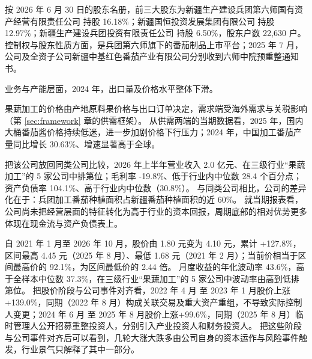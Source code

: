  按 2026 年 6 月 30 日的股东名册，前三大股东为新疆生产建设兵团第六师国有资产经营有限责任公司 持股 16.18\%；新疆国恒投资发展集团有限公司 持股 12.97\%；新疆生产建设兵团投资有限责任公司 持股 6.50\%，股东户数 22,630 户。 控制权与股东性质方面，是兵团第六师旗下的番茄制品上市平台；2025 年 7 月，公司及全资子公司新疆中基红色番茄产业有限公司分别收到六师中院预重整通知书。

 业务与产能层面，2024 年，出口量及价格水平整体下滑。

 果蔬加工的价格由产地原料果价格与出口订单决定，需求端受海外需求与关税影响（第 \ref{sec:framework} 章的供需框架）。 从供需两端的当期数据看，2025 年，国内大桶番茄酱价格持续低迷，进一步加剧价格下行压力；2024 年，中国加工番茄产量同比增长 30.63\%、增速显著高于全球。

 把该公司放回同类公司比较，2026 年上半年营业收入 2.0 亿元、在三级行业“果蔬加工”的 5 家公司中排第位；毛利率 -19.8\%、低于行业内中位数 28.4 个百分点；资产负债率 104.1\%、高于行业内中位数（30.8\%）。 与同类公司相比，公司的差异化在于：兵团加工番茄种植面积占新疆番茄种植面积的近 60\%。 就当期报表看，公司尚未把经营层面的特征转化为高于行业的资本回报，周期底部的相对优势更多体现在现金流与资产负债表上。

 自 2021 年 1 月至 2026 年 10 月，股价由 1.80 元变为 4.10 元，累计 +127.8\%，区间最高 4.45 元（2025 年 8 月）、最低 1.68 元（2021 年 2 月）；当前价相当于区间最高价的 92.1\%，为区间最低价的 2.44 倍。 月度收益的年化波动率 43.6\%，高于全样本中位数 37.3\%，在三级行业“果蔬加工”的 5 家公司中波动率由高到低排第位。 把股价阶段与公司事件对齐看，2022 年 4 月 至 2023 年 1 月股价上涨+139.0\%，同期（2022 年 8 月）构成关联交易及重大资产重组，不导致实际控制人变更；2024 年 6 月 至 2025 年 8 月股价上涨+99.6\%，同期（2025 年 8 月）临时管理人公开招募重整投资人，分别引入产业投资人和财务投资人。 把这些阶段与公司事件对齐后可以看到，几轮大涨大跌多由公司自身的资本运作与风险事件触发，行业景气只解释了其中一部分。

